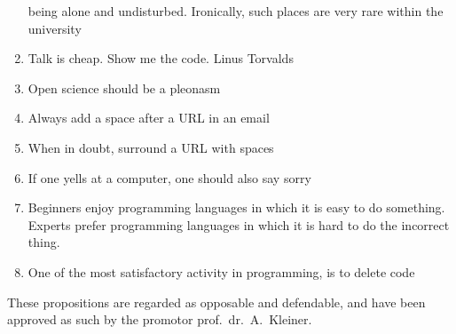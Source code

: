 \documentclass{dissertation}
\begin{document}
\begin{enumerate}
      being alone and undisturbed. Ironically, such places are very rare
      within the university
\item Talk is cheap. Show me the code. Linus Torvalds
\item Open science should be a pleonasm
\item Always add a space after a URL in an email
\item When in doubt, surround a URL with spaces
\item If one yells at a computer, one should also say sorry
\item Beginners enjoy programming languages in which it is easy to do something.
      Experts prefer programming languages in which it is hard to do the incorrect thing.
\item One of the most satisfactory activity in programming, is to delete code

\end{enumerate}

\bigskip
\bigskip

\begin{center}
These propositions are regarded as opposable and defendable, and have been approved as such by the promotor prof.\ dr.\ A.\ Kleiner.
\end{center}
\end{document}
